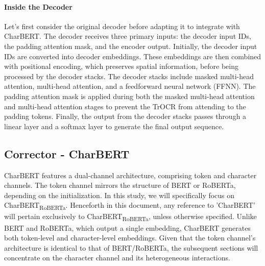 
\paragraph*{Inside the Decoder}
\label{par:3_inside_the_decoder}
Let's first consider the original decoder before adapting it to integrate with CharBERT. The decoder receives three primary inputs: the decoder input IDs, the padding attention mask, and the encoder output. Initially, the decoder input IDs are converted into decoder embeddings. These embeddings are then combined with positional encoding, which preserves spatial information, before being processed by the decoder stacks. The decoder stacks include masked multi-head attention, multi-head attention, and a feedforward neural network (FFNN). The padding attention mask is applied during both the masked multi-head attention and multi-head attention stages to prevent the TrOCR from attending to the padding tokens. Finally, the output from the decoder stacks passes through a linear layer and a softmax layer to generate the final output sequence.

\subsection{Corrector - CharBERT}
\label{subsec:3_corrector_charbert}
CharBERT features a dual-channel architecture, comprising token and character channels. The token channel mirrors the structure of BERT or RoBERTa, depending on the initialization. In this study, we will specifically focus on CharBERT\textsubscript{RoBERTa}. Henceforth in this document, any reference to 'CharBERT' will pertain exclusively to CharBERT\textsubscript{RoBERTa}, unless otherwise specified. Unlike BERT and RoBERTa, which output a single embedding, CharBERT generates both token-level and character-level embeddings. Given that the token channel's architecture is identical to that of BERT/RoBERTa, the subsequent sections will concentrate on the character channel and its heterogeneous interactions.

